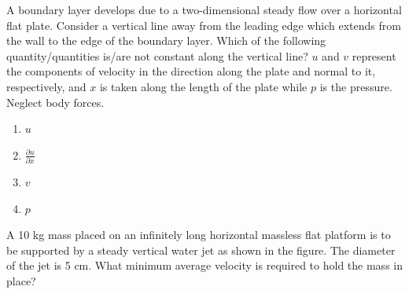     \item A boundary layer develops due to a two-dimensional steady flow over a horizontal flat plate. Consider a vertical line away from the leading edge which extends from the wall to the edge of the boundary layer. Which of the following quantity/quantities is/are not constant along the vertical line? $u$ and $v$ represent the components of velocity in the direction along the plate and normal to it, respectively, and $x$ is taken along the length of the plate while $p$ is the pressure. Neglect body forces.
    \begin{enumerate}
        \item $u$
        \item $\frac{\partial u}{\partial x}$
        \item $v$
        \item $p$
    \end{enumerate}
\bigskip
    \item A 10 kg mass placed on an infinitely long horizontal massless flat platform is to be supported by a steady vertical water jet as shown in the figure. The diameter of the jet is 5 cm. What minimum average velocity is required to hold the mass in place?
\begin{figure}[H] %
\centering
{}
\end{figure}
    
